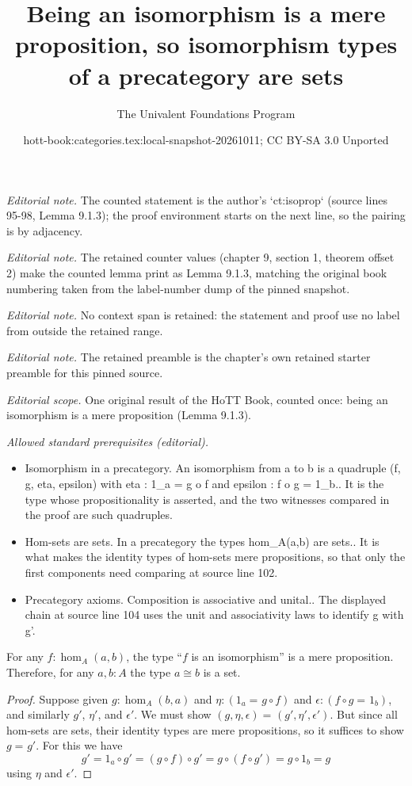 \documentclass[10pt,a4paper]{article}
\title{Being an isomorphism is a mere proposition, so isomorphism types of a precategory are sets}
\author{The Univalent Foundations Program}
\date{hott-book:categories.tex:local-snapshot-20261011; CC BY-SA 3.0 Unported}
\newcounter{chapter}
\newcommand{\id}[3][]{\ensuremath{#2 =_{#1} #3}\xspace}
\theoremstyle{definition}
\theoremstyle{remark}
\numberwithin{equation}{section}
\begin{document}
\maketitle
\setcounter{chapter}{9}
\setcounter{section}{1}
\setcounter{thm}{2}
\noindent\textit{Editorial note.} The counted statement is the author's `ct:isoprop` (source lines 95-98, Lemma 9.1.3); the proof environment starts on the next line, so the pairing is by adjacency.\par\medskip
\noindent\textit{Editorial note.} The retained counter values (chapter 9, section 1, theorem offset 2) make the counted lemma print as Lemma 9.1.3, matching the original book numbering taken from the label-number dump of the pinned snapshot.\par\medskip
\noindent\textit{Editorial note.} No context span is retained: the statement and proof use no label from outside the retained range.\par\medskip
\noindent\textit{Editorial note.} The retained preamble is the chapter's own retained starter preamble for this pinned source.\par\medskip
\noindent\textit{Editorial scope.} One original result of the HoTT Book, counted once: being an isomorphism is a mere proposition (Lemma 9.1.3).\par\medskip
\noindent\textit{Allowed standard prerequisites (editorial).}\begin{itemize}
\item Isomorphism in a precategory. An isomorphism from a to b is a quadruple (f, g, eta, epsilon) with eta : 1\_a = g o f and epsilon : f o g = 1\_b.. It is the type whose propositionality is asserted, and the two witnesses compared in the proof are such quadruples.
\item Hom-sets are sets. In a precategory the types hom\_A(a,b) are sets.. It is what makes the identity types of hom-sets mere propositions, so that only the first components need comparing at source line 102.
\item Precategory axioms. Composition is associative and unital.. The displayed chain at source line 104 uses the unit and associativity laws to identify g with g'.
\end{itemize}\medskip
\begin{lem}\label{ct:isoprop}
  For any $f:\hom_A(a,b)$, the type ``$f$ is an isomorphism'' is a mere proposition.
  Therefore, for any $a,b:A$ the type $a\cong b$ is a set.
\end{lem}

\begin{proof}
  Suppose given $g:\hom_A(b,a)$ and $\eta:(\id{1_a}{g\circ f})$ and $\epsilon:(\id{f\circ g}{1_b})$, and similarly $g'$, $\eta'$, and $\epsilon'$.
We must show $\id{(g,\eta,\epsilon)}{(g',\eta',\epsilon')}$.
  But since all hom-sets are sets, their identity types are mere propositions, so it suffices to show $\id g {g'}$.
  For this we have
  \[g' = 1_a\circ g' = (g\circ f)\circ g' = g\circ (f\circ g') = g\circ 1_b = g\]
  using $\eta$ and $\epsilon'$.
\end{proof}
\end{document}
